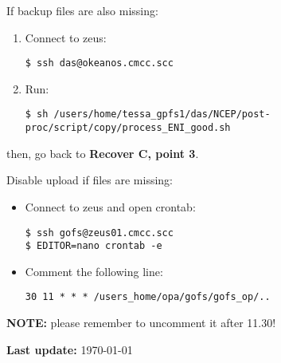 \documentclass[twocolumn,8pt]{article}
\begin{document}
\begin{mdframed}[frametitle=(Recover D)\ -- Before 11 am]

If backup files are also missing:

\begin{enumerate}\itemsep0pt
    \item Connect to zeus:
    \begin{lstlisting}
$ ssh das@okeanos.cmcc.scc
    \end{lstlisting}
    
    \item Run:
\begin{lstlisting}[breaklines=true]
$ sh /users/home/tessa_gpfs1/das/NCEP/post-proc/script/copy/process_ENI_good.sh
\end{lstlisting}

\end{enumerate}

then, go back to \textbf{Recover C, point 3}.

\end{mdframed}

\begin{mdframed}[frametitle=(E)\ -- Before 11.30 am]

Disable upload if files are missing:

\begin{itemize}\itemsep0pt
    \item Connect to zeus and open crontab:
\begin{lstlisting}
$ ssh gofs@zeus01.cmcc.scc
$ EDITOR=nano crontab -e
    \end{lstlisting}
    
    \item Comment the following line:
    \begin{lstlisting}
30 11 * * * /users_home/opa/gofs/gofs_op/..
    \end{lstlisting}
\end{itemize}

\textbf{NOTE:} please remember to uncomment it after 11.30!

\end{mdframed}


{\hfill\footnotesize\textbf{Last update:} \today}
\end{document}
